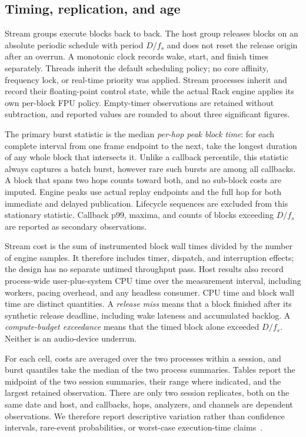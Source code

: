 \subsection{Timing, replication, and age}
Stream groups execute blocks back to back. The host group releases blocks on
an absolute periodic schedule with period $D/f_s$ and does not reset the
release origin after an overrun. A monotonic clock records wake, start, and
finish times separately. Threads inherit the default scheduling policy; no
core affinity, frequency lock, or real-time priority was applied. Stream
processes inherit and record their floating-point control state, while the
actual Rack engine applies its own per-block FPU policy. Empty-timer
observations are retained without subtraction, and reported values are
rounded to about three significant figures.

The primary burst statistic is the median \emph{per-hop peak block time}: for
each complete interval from one frame endpoint to the next, take the longest
duration of any whole block that intersects it. Unlike a callback percentile,
this statistic always captures a batch burst, however rare such bursts are
among all callbacks. A block that spans two hops counts toward both, and no
sub-block costs are imputed. Engine peaks use actual replay endpoints and the
full hop for both immediate and delayed publication. Lifecycle sequences are
excluded from this stationary statistic. Callback p99, maxima, and counts of
blocks exceeding $D/f_s$ are reported as secondary observations.

Stream cost is the sum of instrumented block wall times divided by the number
of engine samples. It therefore includes timer, dispatch, and interruption
effects; the design has no separate untimed throughput pass. Host results also
record process-wide user-plus-system CPU time over the measurement interval,
including workers, pacing overhead, and any headless consumer. CPU time and
block wall time are distinct quantities. A \emph{release miss} means that a
block finished after its synthetic release deadline, including wake lateness
and accumulated backlog. A \emph{compute-budget exceedance} means that the
timed block alone exceeded $D/f_s$. Neither is an audio-device underrun.

For each cell, costs are averaged over the two processes within a session,
and burst quantiles take the median of the two process summaries. Tables
report the midpoint of the two session summaries, their range where
indicated, and the largest retained observation. There are only two session
replicates, both on the same date and host, and callbacks, hops, analyzers,
and channels are dependent observations. We therefore report descriptive
variation rather than confidence intervals, rare-event probabilities, or
worst-case execution-time claims~\cite{kalibera2013,mytkowicz2009,wilhelm2008}.

